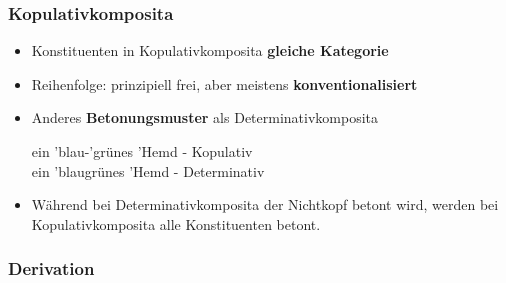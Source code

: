 \begin{frame}
\frametitle{Kopulativkomposita}

\begin{itemize}
	\item Konstituenten in Kopulativkomposita \ras \textbf{gleiche Kategorie}
	\item Reihenfolge: prinzipiell frei, aber meistens \textbf{konventionalisiert}
	\item Anderes \textbf{Betonungsmuster} als Determinativkomposita
	
	\ea ein 'blau-'grünes 'Hemd - Kopulativ \\
		 ein 'blaugrünes 'Hemd - Determinativ
	\z
		 
	\item Während bei Determinativkomposita der Nichtkopf betont wird, werden bei Kopulativkomposita alle Konstituenten betont.
\end{itemize}


\end{frame}










\subsubsection{Derivation}




